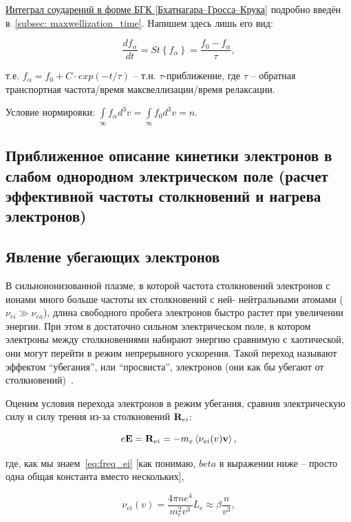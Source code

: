 \documentclass[10pt, a4paper]{article}
\begin{document}
\uline{Интеграл соударений в форме БГК [Бхатнагара–Гросса–Крука]} подробно введён в~\ref{subsec: maxwellization_time}. Напишем здесь лишь его вид:

\begin{equation} \label{eq:BGK_collision_term}
	\frac{df_\alpha}{dt} = St\left\lbrace f_\alpha\right\rbrace = \frac{f_0-f_\alpha}{\tau},
\end{equation}

т.е. $f_\alpha = f_0 + C\cdot exp(-t/\tau)$ -- т.н. $\tau$-приближение, где $\tau$ -- обратная транспортная частота/время максвеллизации/время релаксации.

Условие нормировки: $\int\limits_{\infty}f_\alpha d^3v =\int\limits_{\infty}f_0d^3v = n$.

\subsection{Приближенное описание кинетики электронов в слабом однородном электрическом поле (расчет эффективной частоты столкновений и нагрева электронов)}

\subsection{Явление убегающих электронов}

В сильноионизованной плазме, в которой частота столкновений электронов с ионами много больше частоты их столкновений с ней- нейтральными атомами ($\nu_{ei}\gg\nu_{ea}$), длина свободного пробега электронов быстро растет при увеличении энергии. При этом в достаточно сильном электрическом поле, в котором электроны между столкновениями набирают энергию сравнимую с хаотической, они могут перейти в режим непрерывного ускорения. Такой переход называют эффектом ``убегания'', или ``просвиста'', электронов (они как бы убегают от столкновений)~\cite{golant}.

Оценим условия перехода электронов в режим убегания, сравнив электрическую силу и силу трения из-за столкновений $\vb{R}_{ei}$:

\begin{equation*}
	e\vb{E}=\vb{R}_{ei}=-m_e\left\langle \nu_{ei}(v)\vb{v}\right\rangle, 
\end{equation*}

где, как мы знаем~\eqref{eq:freq_ei} [как понимаю, $beta$ в выражении ниже -- просто одна общая константа вместо нескольких],

\begin{equation*}
	\nu_{ei}(v) = \frac{4\pi n e^4}{m_e^2v^3}L_e\approx\beta \frac{n}{v^3},
\end{equation*}
\end{document}
